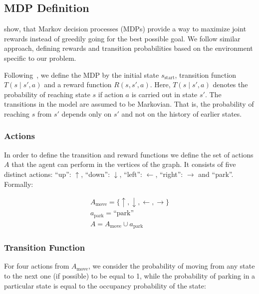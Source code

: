 \subsection{MDP Definition} %
\label{sub:mdp_definition}

\citet{tipaldiICRA11} show, that Markov decision processes (MDPs) provide a
way to maximize joint rewards instead of greedily going for the best possible
goal. We follow similar approach, defining rewards and transition
probabilities based on the environment specific to our problem.

Following~\citet{bellman1957}, we define the MDP by the initial state
$s_\mathrm{start}$, transition function $T(s \mid s', a)$ and a reward
function $R(s, s', a)$. Here, $T(s \mid s', a)$ denotes the probability of
reaching state $s$ if action $a$ is carried out in state $s'$. The transitions
in the model are assumed to be Markovian. That is, the probability of reaching
$s$ from $s'$ depends only on $s'$ and not on the history of earlier states.

\subsubsection{Actions} %
\label{sub:actions}

In order to define the transition and reward functions we define the set of
actions $A$ that the agent can perform in the vertices of the graph. It
consists of five distinct actions: ``up'': $\uparrow$, ``down'': $\downarrow$,
``left'': $\leftarrow$, ``right'': $\rightarrow$ and ``park''. Formally:

\begin{eqnarray}
A_{\mathrm{move}} = \{ \uparrow, \downarrow, \leftarrow, \rightarrow \} \\
a_{\mathrm{park}} = \mbox{``park''} \\
A = A_{\mathrm{move}} \cup a_{\mathrm{park}}
\label{eq:actions}
\end{eqnarray}



\subsubsection{Transition Function} %
\label{ssub:transition_function}

For four actions from $A_\mathrm{move}$, we consider the probability of moving
from any state to the next one (if possible) to be equal to 1, while the
probability of parking in a particular state is equal to the occupancy
probability of the state:

